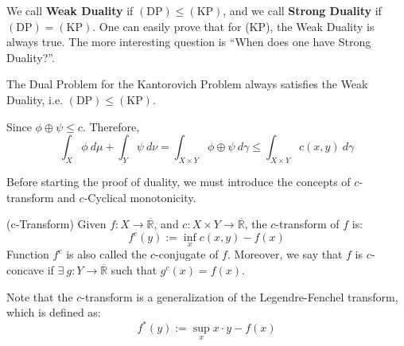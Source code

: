 We call \textbf{Weak Duality} if
$\mathrm{(DP)} \leq \mathrm{(KP)}$, and we call \textbf{Strong Duality}
if
$\mathrm{(DP)} = \mathrm{(KP)}$.
One can easily prove that for (KP), the Weak Duality is always true.
The more interesting question is ``When does one have Strong Duality?''.

\begin{lemma}
  The Dual Problem for the Kantorovich Problem always satisfies the
  Weak Duality, i.e.
$\mathrm{(DP)} \leq \mathrm{(KP)}$.
\end{lemma}

\begin{prf}
  Since $\phi \oplus \psi \leq c$. Therefore,
  \begin{equation*}
    \int_X \phi \ d\mu +
    \int_Y \psi \ d\nu
    =
    \int_{X \times Y} \phi \oplus \psi \ d\gamma \leq
    \int_{X\times Y} c(x,y) \ d\gamma
  \end{equation*}
\end{prf}

Before starting the proof of duality, we must introduce the concepts
of $c$-transform and $c$-Cyclical monotonicity.

\begin{definition}(c-Transform)
  Given $f: X \to \overline{\mathbb R}$, and
  $c:X\times Y \to \overline{\mathbb R}$,
  the $c$-transform of $f$ is:
  \begin{equation}
    f^c(y) := \inf_x c(x,y) - f(x)
  \end{equation}
  Function $f^c$ is also called the $c$-conjugate of $f$. Moreover,
  we say that $f$ is $c$-concave if
  $\exists \ g:Y\to \overline{\mathbb R}$
  such that $g^c(x) = f(x)$.
  \label{def:c-transform}

  Note that the $c$-transform is a generalization of the
  Legendre-Fenchel transform, which is defined as:
  \begin{equation}
    f^*(y) := \sup_x x \cdot y - f(x)
  \end{equation}
\end{definition}

